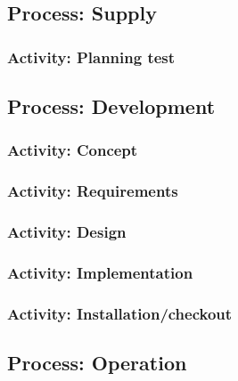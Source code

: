 	\subsection{Process: Supply} \label{s:details-of-the-master-test-plan:process-supply}
		
		\subsubsection{Activity: Planning test} \label{s:details-of-the-master-test-plan:activity-planning-tests}
		
	\subsection{Process: Development} \label{s:details-of-the-master-test-plan:process-development}
		
		\subsubsection{Activity: Concept} \label{s:details-of-the-master-test-plan:activity-concept}
		
		\subsubsection{Activity: Requirements} \label{s:details-of-the-master-test-plan:activity-requirements}
		
		\subsubsection{Activity: Design} \label{s:details-of-the-master-test-plan:activity-design}
		
		\subsubsection{Activity: Implementation} \label{s:details-of-the-master-test-plan:activity-implementation}
		
		\subsubsection{Activity: Installation/checkout} \label{s:details-of-the-master-test-plan:activity-installation-checkout}
		
	\subsection{Process: Operation} \label{s:details-of-the-master-test-plan:process-operation}
		
